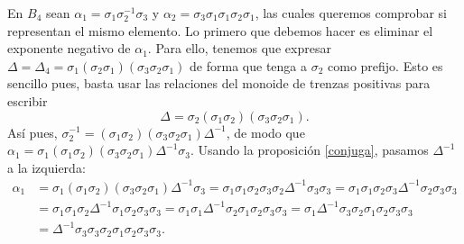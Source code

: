 \documentclass[TFG.tex]{subfiles}
\begin{document}
\begin{ej}\label{ejnormal}
En $B_4$ sean $\alpha_1=\sigma_1\sigma_2^{-1}\sigma_3$ y $\alpha_2=\sigma_3\sigma_1\sigma_1\sigma_2\sigma_1$, las cuales queremos comprobar si representan el mismo elemento. Lo primero que debemos hacer es eliminar el exponente negativo de $\alpha_1$. Para ello, tenemos que expresar $\Delta=\Delta_4=\sigma_1(\sigma_2\sigma_1)(\sigma_3\sigma_2\sigma_1)$ de forma que tenga a $\sigma_2$ como prefijo. Esto es sencillo pues, basta usar las relaciones del monoide de trenzas positivas para escribir
\[
\Delta=\sigma_2(\sigma_1\sigma_2)(\sigma_3\sigma_2\sigma_1).
\]
Así pues, $\sigma_2^{-1}=(\sigma_1\sigma_2)(\sigma_3\sigma_2\sigma_1)\Delta^{-1}$, de modo que $\alpha_1=\sigma_1(\sigma_1\sigma_2)(\sigma_3\sigma_2\sigma_1)\Delta^{-1}\sigma_3$. Usando la proposición \ref{conjuga}, pasamos $\Delta^{-1}$ a la izquierda:
\begin{align*}
\alpha_1&=\sigma_1(\sigma_1\sigma_2)(\sigma_3\sigma_2\sigma_1)\Delta^{-1}\sigma_3=\sigma_1\sigma_1\sigma_2\sigma_3\sigma_2\Delta^{-1}\sigma_3\sigma_3=\sigma_1\sigma_1\sigma_2\sigma_3\Delta^{-1}\sigma_2\sigma_3\sigma_3\\
 & =\sigma_1\sigma_1\sigma_2\Delta^{-1}\sigma_1\sigma_2\sigma_3\sigma_3=\sigma_1\sigma_1\Delta^{-1}\sigma_2\sigma_1\sigma_2\sigma_3\sigma_3=\sigma_1\Delta^{-1}\sigma_3\sigma_2\sigma_1\sigma_2\sigma_3\sigma_3\\
 & =\Delta^{-1}\sigma_3\sigma_3\sigma_2\sigma_1\sigma_2\sigma_3\sigma_3.
\end{align*}


\end{ej}
\end{document}
